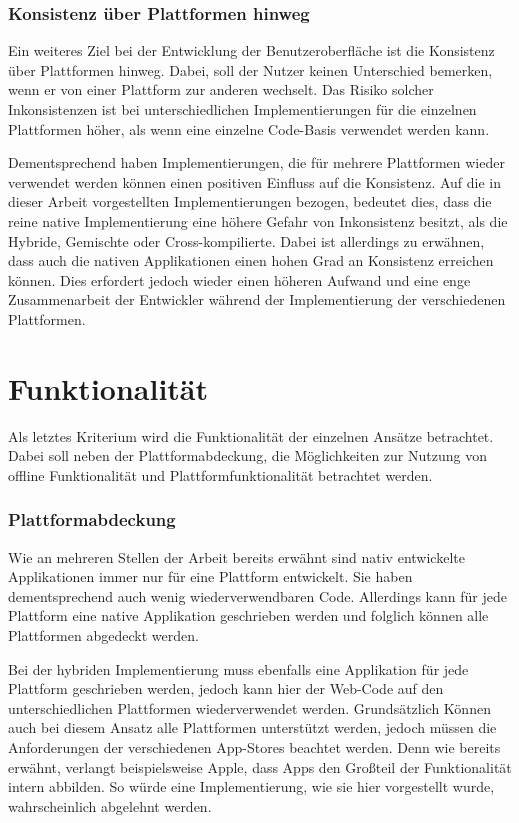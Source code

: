 \subsubsection{Konsistenz über Plattformen hinweg}
Ein weiteres Ziel bei der Entwicklung der Benutzeroberfläche ist die Konsistenz über Plattformen hinweg.
Dabei, soll der Nutzer keinen Unterschied bemerken, wenn er von einer Plattform zur anderen wechselt. 
Das Risiko solcher Inkonsistenzen ist bei unterschiedlichen Implementierungen für die einzelnen Plattformen höher, als wenn eine einzelne Code-Basis verwendet werden kann.

Dementsprechend haben Implementierungen, die für mehrere Plattformen wieder verwendet werden können einen positiven Einfluss auf die Konsistenz.
Auf die in dieser Arbeit vorgestellten Implementierungen bezogen, bedeutet dies, dass die reine native Implementierung eine höhere Gefahr von Inkonsistenz besitzt, als die Hybride, Gemischte oder Cross-kompilierte.
Dabei ist allerdings zu erwähnen, dass auch die nativen Applikationen einen hohen Grad an Konsistenz erreichen können. Dies erfordert jedoch wieder einen höheren Aufwand und eine enge Zusammenarbeit der Entwickler während der Implementierung der verschiedenen Plattformen.

\section{Funktionalität}
Als letztes Kriterium wird die Funktionalität der einzelnen Ansätze betrachtet. Dabei soll neben der Plattformabdeckung, die Möglichkeiten zur Nutzung von offline Funktionalität und Plattformfunktionalität betrachtet werden.

\subsubsection{Plattformabdeckung}
Wie an mehreren Stellen der Arbeit bereits erwähnt sind nativ entwickelte Applikationen immer nur für eine Plattform entwickelt. Sie haben dementsprechend auch wenig wiederverwendbaren Code. Allerdings kann für jede Plattform eine native Applikation geschrieben werden und folglich können alle Plattformen abgedeckt werden.

Bei der hybriden Implementierung muss ebenfalls eine Applikation für jede Plattform geschrieben werden, jedoch kann hier der Web-Code auf den unterschiedlichen Plattformen wiederverwendet werden. Grundsätzlich Können auch bei diesem Ansatz alle Plattformen unterstützt werden, jedoch müssen die Anforderungen der verschiedenen App-Stores beachtet werden. Denn wie bereits erwähnt, verlangt beispielsweise Apple, dass Apps den Großteil der Funktionalität intern abbilden. So würde eine Implementierung, wie sie hier vorgestellt wurde, wahrscheinlich abgelehnt werden.

